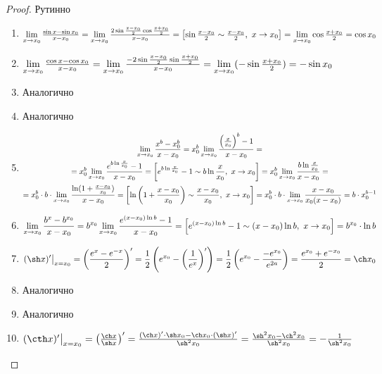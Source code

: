 \begin{proof}
	Рутинно
	\begin{enumerate}
		\item 
			$\lim\limits_{x \to x_0} \frac{\sin x - \sin x_0}{x - x_0} =
			\lim\limits_{x \to x_0} \frac{2 \sin \frac{x - x_0}{2}
			\cos \frac{x + x_0}{2}}{x - x_0} =
			\left[\sin \frac{x - x_0}{2} \sim \frac{x - x_0}{2},\ x \to x_0\right]
			= \lim\limits_{x \to x_0}	\cos \frac{x + x_0}{2} = \cos x_0$
			
		\item 
			$\lim\limits_{x \to x_0} \frac{\cos x - \cos x_0}{x - x_0} =
			\lim\limits_{x \to x_0} \frac{-2 \sin \frac{x - x_0}{2}
			\sin \frac{x + x_0}{2}}{x - x_0} =
			\lim\limits_{x \to x_0} (-\sin \frac{x + x_0}{2}) = -\sin x_0$
		
		\item Аналогично
		\item Аналогично

		\item 
		\begin{multline*}
			\lim\limits_{x \to x_0} \frac{x^b - x_0^b}{x - x_0} = 
			x_0^b \lim\limits_{x \to x_0} \frac{\left(\frac{x}{x_0}\right)^b - 1}{x - x_0} = \\
			= x_0^b \lim\limits_{x \to x_0} \frac{e^{b \ln \frac{x}{x_0}} - 1}{x - x_0} =
			\left[e^{b \ln \frac{x}{x_0}} - 1 \sim
			b \ln \frac{x}{x_0},\ x \to x_0\right] =
			x_0^b \lim\limits_{x \to x_0} \frac{b \ln \frac{x}{x_0}}{x - x_0} = \\
		    = x_0^b \cdot b \cdot \lim\limits_{x \to x_0}
			\frac{\ln(1 + \frac{x - x_0}{x_0})}{x - x_0} =
			\left[\ln \left(1 + \frac{x - x_0}{x_0}\right) \sim
			\frac{x - x_0}{x_0},\ x \to x_0\right] =
			x_0^b \cdot b \cdot \lim\limits_{x \to x_0} \frac{x - x_0}{x_0(x - x_0)}
			= b \cdot x_0^{b - 1}
		\end{multline*}
		
		\item
		\[
			\lim\limits_{x \to x_0} \frac{b^x - b^{x_0}}{x - x_0} =
			b^{x_0} \lim\limits_{x \to x_0} \frac{e^{(x - x_0)\ln b } - 1}{x - x_0} =
			\left[ e^{(x - x_0)\ln b} - 1 \sim  (x - x_0)\ln b,\ x \to x_0 \right] =
			b^{x_0} \cdot \ln b
		\]
		
		\item
		\[
			(\sh x)' \big|_{x = x_0} =
			\left(\frac{e^x - e^{-x}}{2}\right)' =
			\frac{1}{2}\left(e^{x_0} -
			\left(\frac{1}{e^x}\right)'\right) =
			\frac{1}{2}\left(e^{x_0} - \frac{-e^{x_0}}{e^{2a}}\right) =
			\frac{e^{x_0} + e^{-x_0}}{2} = \ch x_0
		\]
		
		\item Аналогично
		\item Аналогично

		\item
			$(\cth x)' \big|_{x = x_0} =
			\left(\frac{\ch x}{\sh x}\right)' =
			\frac{(\ch x)' \cdot \sh x_0 - \ch x_0 \cdot
			(\sh x)'}{\sh^2 x_0} =\frac{\sh^2 x_0 - \ch^2 x_0}{\sh^2 x_0} =
			-\frac{1}{\sh^2 x_0}$
	\end{enumerate}
\end{proof}

